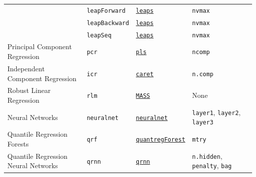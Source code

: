 \documentclass[12pt]{article}
\newcommand{\code}[1]{\mbox{\footnotesize\color{darkblue}\texttt{#1}}}
\begin{document}
\begin{landscape}
\begin{longtable}{lllll}
            
\rowcolor[rgb]{.95, .95, .95}                     
            &
         \code{leapForward} & 
             {\tt \href{http://cran.r-project.org/web/packages/leaps/index.html}{leaps}}       & 
            \code{nvmax} & \\  
\rowcolor[rgb]{.95, .95, .95}                     
            &
         \code{leapBackward} & 
             {\tt \href{http://cran.r-project.org/web/packages/leaps/index.html}{leaps}}       & 
            \code{nvmax}  & \\  
\rowcolor[rgb]{.95, .95, .95}                     
            &
         \code{leapSeq} & 
             {\tt \href{http://cran.r-project.org/web/packages/leaps/index.html}{leaps}}       & 
            \code{nvmax}  & \\              

       Principal Component Regression&
         \code{pcr} & 
             {\tt \href{http://cran.r-project.org/web/packages/pls/index.html}{pls}}      & 
            \code{ncomp}  & \\  

\rowcolor[rgb]{.95, .95, .95}   
       Independent Component Regression&
         \code{icr} & 
             {\tt \href{http://cran.r-project.org/web/packages/caret/index.html}{caret}}      & 
            \code{n.comp} & \\              
           
                
      Robust Linear Regression &
         \code{rlm} & 
             {\tt \href{http://cran.r-project.org/web/packages/MASS/index.html}{MASS}}       & 
            None & \\              
            
\rowcolor[rgb]{.95, .95, .95}              
      Neural Networks &
         \code{neuralnet} & 
             {\tt \href{http://cran.r-project.org/web/packages/neuralnet/index.html}{neuralnet}}       & 
            \code{layer1},  \code{layer2}, \code{layer3} & \\         
              
      Quantile Regression Forests &
         \code{qrf} & 
             {\tt \href{http://cran.r-project.org/web/packages/quantregForest/index.html}{quantregForest}}       & 
            \code{mtry} & \\      
            
        Quantile Regression Neural Networks &
        \code{qrnn} &
         {\tt \href{http://cran.r-project.org/web/packages/qrnn/index.html}{qrnn}}    & 
            \code{n.hidden}, \code{penalty}, \code{bag}  & \\             
                   

\end{longtable}
\end{landscape}
\end{document}
